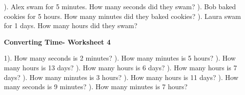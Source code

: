\documentclass{article}%
\begin{document}
\newline%
). Alex swam for 5 minutes. How many seconds did they swam?%
\newline%
\newline%
). Bob baked cookies for 5 hours. How many minutes did they baked cookies?%
\newline%
\newline%
). Laura swam for 1 days. How many hours did they swam?%
\newline%
\newline%
\newline%
\pagebreak%
\large%
\begin{center}%
\textbf{Converting Time- Worksheet 4}%
\newline%
\end{center} \normalsize%
1). How many seconds is 2 minutes?%
\newline%
\newline%
). How many minutes is 5 hours?%
\newline%
\newline%
). How many hours is 13 days?%
\newline%
\newline%
). How many hours is 6 days?%
\newline%
\newline%
). How many hours is 7 days?%
\newline%
\newline%
). How many minutes is 3 hours?%
\newline%
\newline%
). How many hours is 11 days?%
\newline%
\newline%
). How many seconds is 9 minutes?%
\newline%
\newline%
). How many minutes is 7 hours?%
\newline%
\newline%
\newline%
\end{document}
